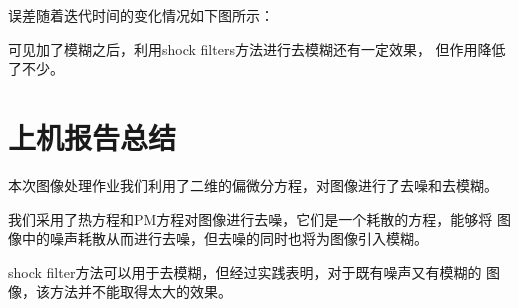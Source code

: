 \documentclass[a4paper,  11pt]{ctexart}
\begin{document}
误差随着迭代时间的变化情况如下图所示：
\begin{figure}[H]
    \centering
\end{figure}
可见加了模糊之后，利用shock filters方法进行去模糊还有一定效果，
但作用降低了不少。

\section{上机报告总结}
本次图像处理作业我们利用了二维的偏微分方程，对图像进行了去噪和去模糊。
\par
我们采用了热方程和PM方程对图像进行去噪，它们是一个耗散的方程，能够将
图像中的噪声耗散从而进行去噪，但去噪的同时也将为图像引入模糊。
\par
shock filter方法可以用于去模糊，但经过实践表明，对于既有噪声又有模糊的
图像，该方法并不能取得太大的效果。
\end{document}
